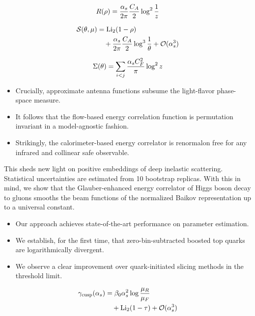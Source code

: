 \begin{equation}
  R(\rho) = \frac{\alpha_s}{2\pi} \frac{C_A}{2} \log^{2} \frac{1}{z}
  \label{eq:3}
\end{equation}

\begin{align}
  \mathcal{S}(\theta, \mu) &= \mathrm{Li}_{2}(1 - \rho) \nonumber \\
  &\quad + \frac{\alpha_s}{2\pi} \frac{C_A}{2} \log^{3} \frac{1}{\theta} + \mathcal{O}(\alpha_s^3) \label{eq:4}
\end{align}

\begin{equation}
  \Sigma(\theta) = \sum_{i<j} \frac{\alpha_s C_F^2}{\pi} \log^2 z
  \label{eq:5}
\end{equation}

\begin{itemize}
  \item Crucially, approximate antenna functions subsume the light-flavor phase-space measure.
  \item It follows that the flow-based energy correlation function is permutation invariant in a model-agnostic fashion.
  \item Strikingly, the calorimeter-based energy correlator is renormalon free for any infrared and collinear safe observable.
\end{itemize}

This sheds new light on positive embeddings of deep inelastic
scattering. Statistical uncertainties are estimated from 10 bootstrap
replicas. With this in mind, we show that the Glauber-enhanced energy
correlator of Higgs boson decay to gluons smooths the beam functions of
the normalized Baikov representation up to a universal constant.

\begin{itemize}
  \item Our approach achieves state-of-the-art performance on parameter estimation.
  \item We establish, for the first time, that zero-bin-subtracted boosted top quarks are logarithmically divergent.
  \item We observe a clear improvement over quark-initiated slicing methods in the threshold limit.
\end{itemize}

\begin{align}
  \gamma_{\rm cusp}(\alpha_s) &= \beta_0 \alpha_s^2 \log\frac{\mu_R}{\mu_F} \nonumber \\
  &\quad + \mathrm{Li}_{2}(1 - \tau) + \mathcal{O}(\alpha_s^3) \label{eq:6}
\end{align}

